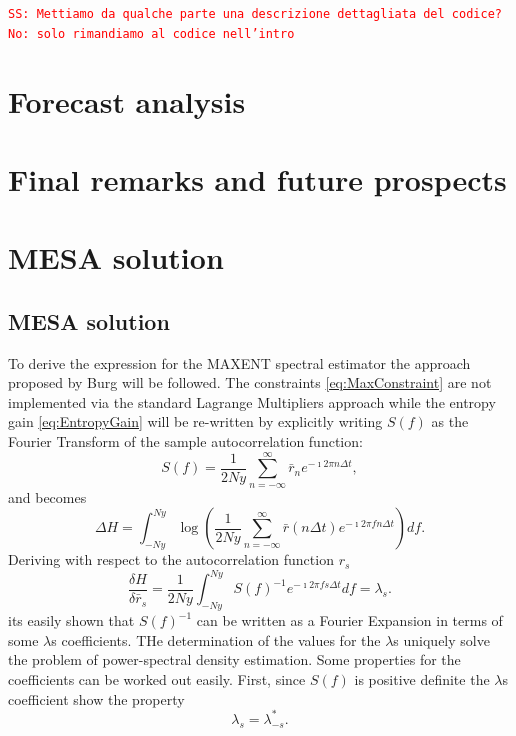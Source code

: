 \documentclass[twocolumn,showpacs,preprintnumbers,nofootinbib,prd,
superscriptaddress,10pt]{revtex4-1}
\newcommand{\sschmidt}[1]{{\textcolor{red}{\texttt{SS: #1}} }}
\begin{document}
\sschmidt{Mettiamo da qualche parte una descrizione dettagliata del codice? No: solo rimandiamo al codice nell'intro}

\section{Forecast analysis}
\section{Final remarks and future prospects}

\appendix
\section{MESA solution} \label{sec:MESA_solution}
\subsection{MESA solution}
To derive the expression for the MAXENT spectral estimator the approach proposed by Burg \cite{burg1975maximum} will be followed. The constraints \ref{eq:MaxConstraint} are not implemented via the standard Lagrange Multipliers approach while the entropy gain \ref{eq:EntropyGain} will be re-written by explicitly writing $S(f)$ as the Fourier Transform of the sample autocorrelation function: 
\begin{equation}
    S(f) = \frac{1}{2 Ny}\sum_{n = -\infty}^{\infty} \bar r_n e^{- \imath 2 \pi n \Delta t},
\end{equation}
and becomes
\begin{equation}
    \Delta H = \int_{-Ny}^{Ny}  
    \log\left(\frac{1}{2 Ny}\sum_{n = -\infty}^{\infty} \bar r(n\Delta t) e^{-\imath 2 \pi f n \Delta t} 
    \right) df.
\end{equation}
Deriving with respect to the autocorrelation function $r_s$
\begin{equation}
      \frac{\delta H}{\delta \bar r_s} = \frac{1}{2Ny}\int_{-Ny}^{Ny} S(f)^{-1}e^{-\imath 2 \pi f s \Delta t } df = \lambda_s. 
\end{equation} 
its easily shown that $S(f)^{-1}$ can be written as a Fourier Expansion in terms of some $\lambda$s coefficients. THe determination of the values for the $\lambda$s uniquely solve the problem of power-spectral density estimation. Some properties for the coefficients can be worked out easily. First, since $S(f)$ is positive definite the $\lambda$s coefficient show the property 
\begin{equation}
\nonumber 
\lambda_s = \lambda_{-s}^*. 
\end{equation}
\end{document}
